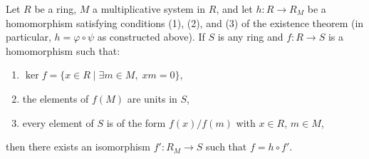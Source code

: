 Let $R$ be a ring, $M$ a multiplicative system in $R$, and let $h: R \to R_M$ be a homomorphism satisfying conditions (1), (2), and (3) of the existence theorem (in particular, $h = \varphi \circ \psi$ as constructed above). If $S$ is any ring and $f: R \to S$ is a homomorphism such that:

\begin{enumerate}
\item $\ker f = \{ x \in R \mid \exists m \in M,\; xm = 0 \}$,
\item the elements of $f(M)$ are units in $S$,
\item every element of $S$ is of the form $f(x)/f(m)$ with $x \in R$, $m \in M$,
\end{enumerate}

then there exists an isomorphism $f': R_M \to S$ such that $f = h \circ f'$.
